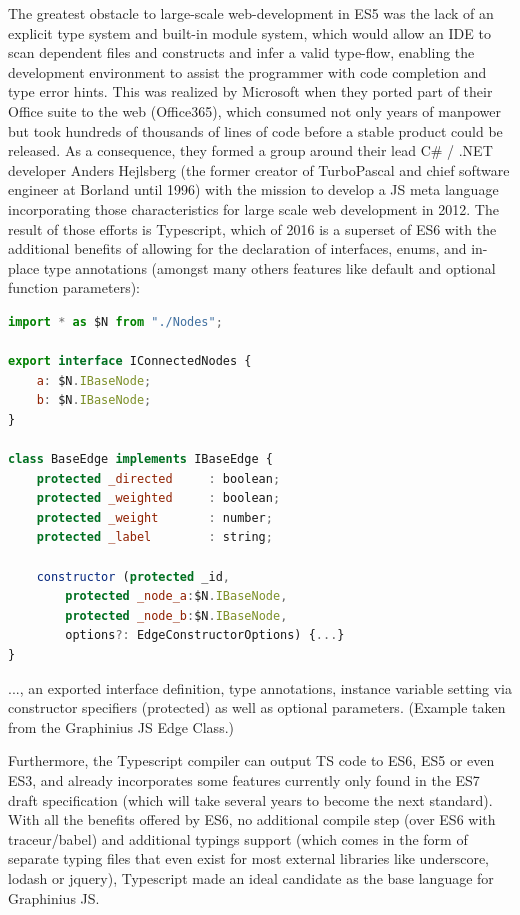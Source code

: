 	The greatest obstacle to large-scale web-development in ES5 was the lack of an explicit type system and built-in module system, which would allow an IDE to scan dependent files and constructs and infer a valid type-flow, enabling the development environment to assist the programmer with code completion and type error hints. This was realized by Microsoft when they ported part of their Office suite to the web (Office365), which consumed not only years of manpower but took hundreds of thousands of lines of code before a stable product could be released. As a consequence, they formed a group around their lead C\# / .NET developer Anders Hejlsberg (the former creator of TurboPascal and chief software engineer at Borland until 1996) with the mission to develop a JS meta language incorporating those characteristics for large scale web development in 2012. The result of those efforts is Typescript, which of 2016 is a superset of ES6 with the additional benefits of allowing for the declaration of interfaces, enums, and in-place type annotations (amongst many others features like default and optional function parameters): 
	
	\begin{lstlisting}[caption={Typescript sample featuring import of an external module...}, label={fig:TS example}, language=JavaScript]
import * as $N from "./Nodes";

export interface IConnectedNodes {
	a: $N.IBaseNode;
	b: $N.IBaseNode;
}

class BaseEdge implements IBaseEdge {
	protected _directed		: boolean;
	protected _weighted 	: boolean;
	protected _weight		: number;
	protected _label		: string;
	
	constructor (protected _id,
		protected _node_a:$N.IBaseNode,
		protected _node_b:$N.IBaseNode,
		options?: EdgeConstructorOptions) {...}
}	
	\end{lstlisting}
	\small
	..., an exported interface definition, type annotations, instance variable setting via constructor specifiers (protected) as well as optional parameters. (Example taken from the Graphinius JS Edge Class.)
	
	Furthermore, the Typescript compiler can output TS code to ES6, ES5 or even ES3, and already incorporates some features currently only found in the ES7 draft specification (which will take several years to become the next standard). With all the benefits offered by ES6, no additional compile step (over ES6 with traceur/babel) and additional typings support (which comes in the form of separate typing files that even exist for most external libraries like underscore, lodash or jquery), Typescript made an ideal candidate as the base language for Graphinius JS.
	

